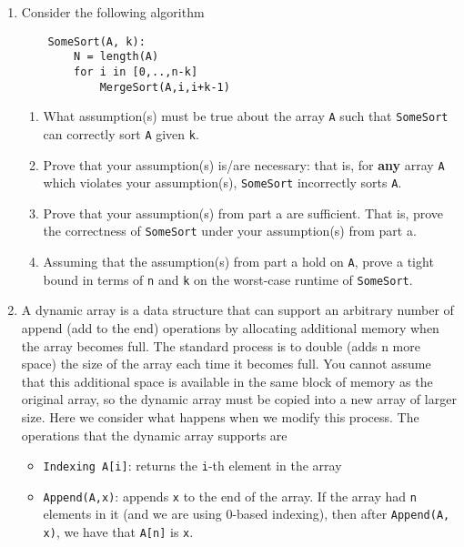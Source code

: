 \documentclass[12pt]{article}
\begin{document}
\begin{enumerate}
\item  Consider the following algorithm
\begin{small}
    \begin{verbatim}
    SomeSort(A, k):
        N = length(A)
        for i in [0,..,n-k]
            MergeSort(A,i,i+k-1)
    \end{verbatim}
\end{small}
\begin{enumerate}
    \item What assumption(s) must be true about the array {\tt A} such that 
        {\tt SomeSort} can correctly sort {\tt A} given {\tt k}. 
    \pagebreak	
    \item Prove that your assumption(s) is/are necessary: that is, for 
        {\bf any} array {\tt A} which violates your assumption(s), 
        {\tt SomeSort} incorrectly sorts {\tt A}.
    \pagebreak	
    \item Prove that your assumption(s) from part a are sufficient. That is,
        prove the correctness of {\tt SomeSort} under your assumption(s) from
        part a.
    \pagebreak	
    \item Assuming that the assumption(s) from part a hold on {\tt A}, prove a
        tight bound in terms of {\tt n} and {\tt k} on the worst-case runtime
        of {\tt SomeSort}.
    \pagebreak	
\end{enumerate}

\item A dynamic array is a data structure that can support an arbitrary number
    of append (add to the end) operations by allocating additional memory when
    the array becomes full. The standard process is to double (adds n more
    space) the size of the array each time it becomes full. You cannot assume
    that this additional space is available in the same block of memory as the
    original array, so the dynamic array must be copied into a new array of
    larger size. Here we consider what happens when we modify this process. The
    operations that the dynamic array supports are 
\begin{itemize}
    \item {\tt Indexing A[i]}: returns the {\tt i}-th element in the array
    \item {\tt Append(A,x)}: appends {\tt x} to the end of the array.  If the
        array had {\tt n} elements in it (and we are using 0-based indexing),
        then after {\tt Append(A, x)}, we have that {\tt A[n]} is {\tt x}.
\end{itemize}


\end{enumerate}
\end{document}
